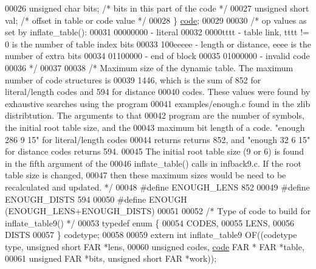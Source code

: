 \begin{DoxyCode}
00026     \textcolor{keywordtype}{unsigned} \textcolor{keywordtype}{char} bits;         \textcolor{comment}{/* bits in this part of the code */}
00027     \textcolor{keywordtype}{unsigned} \textcolor{keywordtype}{short} val;         \textcolor{comment}{/* offset in table or code value */}
00028 \} \hyperlink{structcode}{code};
00029 
00030 \textcolor{comment}{/* op values as set by inflate\_table():}
00031 \textcolor{comment}{    00000000 - literal}
00032 \textcolor{comment}{    0000tttt - table link, tttt != 0 is the number of table index bits}
00033 \textcolor{comment}{    100eeeee - length or distance, eeee is the number of extra bits}
00034 \textcolor{comment}{    01100000 - end of block}
00035 \textcolor{comment}{    01000000 - invalid code}
00036 \textcolor{comment}{ */}
00037 
00038 \textcolor{comment}{/* Maximum size of the dynamic table.  The maximum number of code structures is}
00039 \textcolor{comment}{   1446, which is the sum of 852 for literal/length codes and 594 for distance}
00040 \textcolor{comment}{   codes.  These values were found by exhaustive searches using the program}
00041 \textcolor{comment}{   examples/enough.c found in the zlib distribtution.  The arguments to that}
00042 \textcolor{comment}{   program are the number of symbols, the initial root table size, and the}
00043 \textcolor{comment}{   maximum bit length of a code.  "enough 286 9 15" for literal/length codes}
00044 \textcolor{comment}{   returns returns 852, and "enough 32 6 15" for distance codes returns 594.}
00045 \textcolor{comment}{   The initial root table size (9 or 6) is found in the fifth argument of the}
00046 \textcolor{comment}{   inflate\_table() calls in infback9.c.  If the root table size is changed,}
00047 \textcolor{comment}{   then these maximum sizes would be need to be recalculated and updated. */}
00048 \textcolor{preprocessor}{#define ENOUGH\_LENS 852}
00049 \textcolor{preprocessor}{#define ENOUGH\_DISTS 594}
00050 \textcolor{preprocessor}{#define ENOUGH (ENOUGH\_LENS+ENOUGH\_DISTS)}
00051 
00052 \textcolor{comment}{/* Type of code to build for inflate\_table9() */}
00053 \textcolor{keyword}{typedef} \textcolor{keyword}{enum} \{
00054     CODES,
00055     LENS,
00056     DISTS
00057 \} codetype;
00058 
00059 \textcolor{keyword}{extern} \textcolor{keywordtype}{int} inflate\_table9 OF((codetype type, \textcolor{keywordtype}{unsigned} \textcolor{keywordtype}{short} FAR *lens,
00060                              \textcolor{keywordtype}{unsigned} codes, \hyperlink{structcode}{code} FAR * FAR *table,
00061                              \textcolor{keywordtype}{unsigned} FAR *bits, \textcolor{keywordtype}{unsigned} \textcolor{keywordtype}{short} FAR *work));
\end{DoxyCode}
